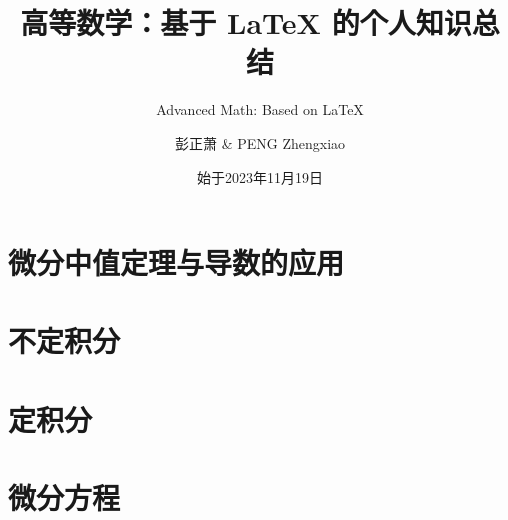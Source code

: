 \documentclass[lang=cn,10pt]{elegantbook}
\title{高等数学：基于 \LaTeX{} 的个人知识总结}
\subtitle{Advanced Math: Based on \LaTeX{}}
\author{彭正萧 \& PENG Zhengxiao}
\institute{西北农林科技大学}
\date{始于2023年11月19日}
\begin{document}
\maketitle


\frontmatter

\tableofcontents


\mainmatter





\chapter{微分中值定理与导数的应用}

\chapter{不定积分}

\chapter{定积分}


\chapter{微分方程}


\appendix
\renewcommand{\thechapter}{\Roman{chapter}}%






\end{document}
